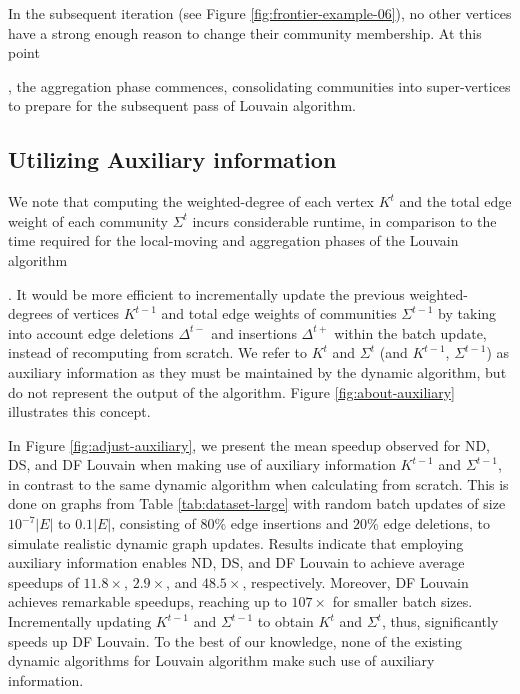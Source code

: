 In the subsequent iteration (see Figure \ref{fig:frontier-example-06}), no other vertices have a strong enough reason to change their community membership. At this point, the aggregation phase commences, consolidating communities into super-vertices to prepare for the subsequent pass of Louvain algorithm.




\subsection{Utilizing Auxiliary information}
\label{sec:auxiliary}

We note that computing the weighted-degree of each vertex $K^t$ and the total edge weight of each community $\Sigma^t$ incurs considerable runtime, in comparison to the time required for the local-moving and aggregation phases of the Louvain algorithm. It would be more efficient to incrementally update the previous weighted-degrees of vertices $K^{t-1}$ and total edge weights of communities $\Sigma^{t-1}$ by taking into account edge deletions $\Delta^{t-}$ and insertions $\Delta^{t+}$ within the batch update, instead of recomputing from scratch. We refer to $K^t$ and $\Sigma^t$ (and $K^{t-1}$, $\Sigma^{t-1}$) as auxiliary information as they must be maintained by the dynamic algorithm, but do not represent the output of the algorithm. Figure \ref{fig:about-auxiliary} illustrates this concept.

In Figure \ref{fig:adjust-auxiliary}, we present the mean speedup observed for ND, DS, and DF Louvain when making use of auxiliary information $K^{t-1}$ and $\Sigma^{t-1}$, in contrast to the same dynamic algorithm when calculating from scratch. This is done on graphs from Table \ref{tab:dataset-large} with random batch updates of size $10^{-7} |E|$ to $0.1 |E|$, consisting of $80\%$ edge insertions and $20\%$ edge deletions, to simulate realistic dynamic graph updates. Results indicate that employing auxiliary information enables ND, DS, and DF Louvain to achieve average speedups of $11.8\times$, $2.9\times$, and $48.5\times$, respectively. Moreover, DF Louvain achieves remarkable speedups, reaching up to $107\times$ for smaller batch sizes. Incrementally updating $K^{t-1}$ and $\Sigma^{t-1}$ to obtain $K^t$ and $\Sigma^t$, thus, significantly speeds up DF Louvain. To the best of our knowledge, none of the existing dynamic algorithms for Louvain algorithm make such use of auxiliary information.


